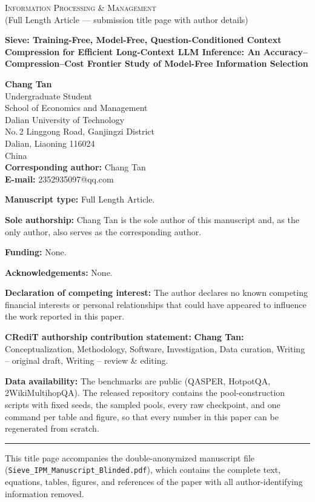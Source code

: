 \documentclass[12pt]{article}
\newcommand{\PaperTitle}{Sieve: Training-Free, Model-Free, Question-Conditioned
Context Compression for Efficient Long-Context LLM Inference: An
Accuracy--Compression--Cost Frontier Study of Model-Free Information Selection}
\begin{document}
\begin{center}
{\large\scshape Information Processing \& Management}\\[0.25em]
{\normalsize (Full Length Article --- submission title page with author details)}
\end{center}

\vspace{0.9em}

\begin{center}
{\LARGE\bfseries \PaperTitle{}}
\end{center}

\vspace{1.1em}

\begin{center}
{\large\bfseries Chang Tan}\\[0.5em]
Undergraduate Student\\
School of Economics and Management\\
Dalian University of Technology\\
No.\,2 Linggong Road, Ganjingzi District\\
Dalian, Liaoning 116024\\
China\\[0.7em]
\textbf{Corresponding author:} Chang Tan\\
\textbf{E-mail:} 2352935097@qq.com
\end{center}

\vspace{1.1em}

\noindent\textbf{Manuscript type:} Full Length Article.

\noindent\textbf{Sole authorship:} Chang Tan is the sole author of this
manuscript and, as the only author, also serves as the corresponding
author.

\noindent\textbf{Funding:} None.

\noindent\textbf{Acknowledgements:} None.

\noindent\textbf{Declaration of competing interest:} The author declares
no known competing financial interests or personal relationships that
could have appeared to influence the work reported in this paper.

\noindent\textbf{CRediT authorship contribution statement:}
\textbf{Chang Tan:} Conceptualization, Methodology, Software,
Investigation, Data curation, Writing -- original draft, Writing -- review
\& editing.

\noindent\textbf{Data availability:} The benchmarks are public (QASPER,
HotpotQA, 2WikiMultihopQA). The released repository contains the
pool-construction scripts with fixed seeds, the sampled pools, every raw
checkpoint, and one command per table and figure, so that every number in
this paper can be regenerated from scratch.

\noindent\rule{\textwidth}{0.4pt}
{\footnotesize This title page accompanies the double-anonymized manuscript
file (\texttt{Sieve\_IPM\_Manuscript\_Blinded.pdf}), which contains the
complete text, equations, tables, figures, and references of the paper with
all author-identifying information removed.}
\end{document}
